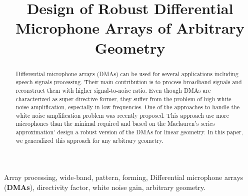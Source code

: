 \documentclass{article}
\title{Design of Robust Differential Microphone Arrays of Arbitrary Geometry}
\begin{document}
%
\maketitle
%
\begin{abstract}
Differential microphone arrays (DMAs) can be used for several applications including speech signals processing. Their main contribution is to process broadband signals and reconstruct them with higher signal-to-noise ratio. Even though DMAs are characterized as super-directive former, they suffer from the problem of high white noise amplification, especially in low frequencies. One of the approaches to handle the white noise amplification problem was recently proposed. This approach use more microphones than the minimal required and based on the Maclauren's series approximation' design a robust version of the DMAs for linear geometry. In this paper, we generalized this approach for any arbitrary geometry. 
\end{abstract}
%
\begin{keywords}
Array processing, wide-band, pattern, forming, Differential microphone arrays (\textbf{DMAs}), directivity factor, white noise gain, arbitrary geometry.
\end{keywords}
%
\end{document}

